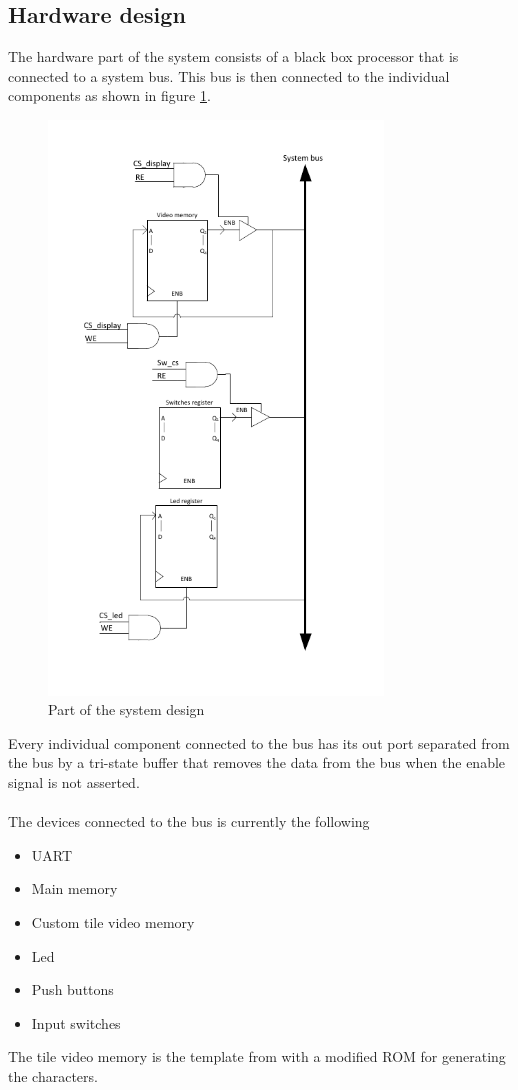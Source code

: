 \documentclass{acm_proc_article-sp}
\begin{document}
\subsection{Hardware design}
The hardware part of the system consists of a black box processor that is connected to a system bus. This bus is then connected to the individual components as shown in figure \ref{fig:system}. 
\begin{figure}[h]
\centering
\includegraphics[width=3.5in]{fig/system.pdf}
\caption{Part of the system design}
\label{fig:system}
\end{figure}
Every individual component connected to the bus has its out port separated from the bus by a tri-state buffer that removes the data from the bus when the enable signal is not asserted.\\\\

The devices connected to the bus is currently the following
\begin{itemize}
	\item UART
	\item Main memory
	\item Custom tile video memory
	\item Led
	\item Push buttons
	\item Input switches
\end{itemize}
The tile video memory is the template from \cite{chu2008fpga} with a modified ROM for generating the characters.
\end{document}

